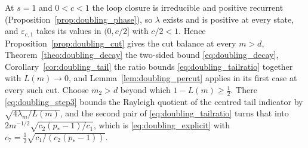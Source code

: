 At $s=1$ and $0<c<1$ the loop closure is irreducible and positive recurrent
(Proposition~\ref{prop:doubling_phase}), so $\lambda$ exists and is positive at every state,
and $\varepsilon_{c,1}$ takes its values in $(0,c/2]$ with $c/2<1$. Hence
Proposition~\ref{prop:doubling_cut} gives the cut balance at every $m>d$,
Theorem~\ref{theo:doubling_decay} the two-sided bound \eqref{eq:doubling_decay},
Corollary~\ref{cor:doubling_tail} the ratio bounds \eqref{eq:doubling_tailratio} together with
$L(m)\rightarrow0$, and Lemma~\ref{lem:doubling_percut} applies in its first case at every such
cut. Choose $m_2>d$ beyond which $1-L(m)\geq\tfrac12$. There \eqref{eq:doubling_step3} bounds
the Rayleigh quotient of the centred tail indicator by $\sqrt{4\lambda_m/L(m)}$, and the second
pair of \eqref{eq:doubling_tailratio} turns that into $2m^{-1/2}\sqrt{c_2(p_*-1)/c_1}$, which is
\eqref{eq:doubling_explicit} with $c_7=\tfrac12\sqrt{c_1/(c_2(p_*-1))}$.
